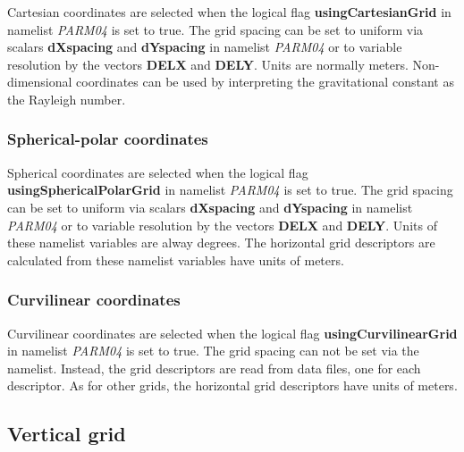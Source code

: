 Cartesian coordinates are selected when the logical flag {\bf
using\-Cartes\-ianGrid} in namelist {\em PARM04} is set to true. The grid
spacing can be set to uniform via scalars {\bf dXspacing} and {\bf
dYspacing} in namelist {\em PARM04} or to variable resolution by the
vectors {\bf DELX} and {\bf DELY}. Units are normally
meters. Non-dimensional coordinates can be used by interpreting the
gravitational constant as the Rayleigh number.

\subsubsection{Spherical-polar coordinates}

Spherical coordinates are selected when the logical flag {\bf
using\-Spherical\-PolarGrid} in namelist {\em PARM04} is set to true. The
grid spacing can be set to uniform via scalars {\bf dXspacing} and
{\bf dYspacing} in namelist {\em PARM04} or to variable resolution by
the vectors {\bf DELX} and {\bf DELY}. Units of these namelist
variables are alway degrees. The horizontal grid descriptors are
calculated from these namelist variables have units of meters.

\subsubsection{Curvilinear coordinates}

Curvilinear coordinates are selected when the logical flag {\bf
using\-Curvil\-inear\-Grid} in namelist {\em PARM04} is set to true. The
grid spacing can not be set via the namelist. Instead, the grid
descriptors are read from data files, one for each descriptor. As for
other grids, the horizontal grid descriptors have units of meters.


\subsection{Vertical grid}

